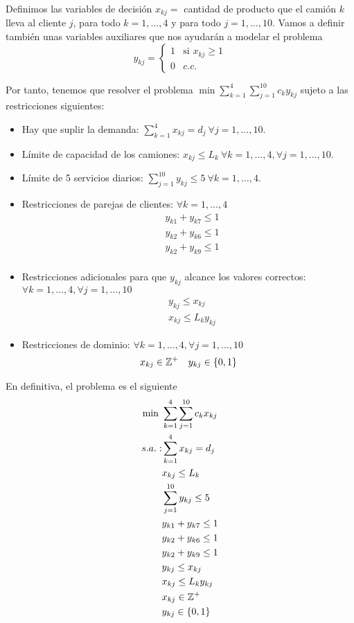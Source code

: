 \documentclass[twoside]{article}
\begin{document}
\begin{solucion}
Definimos las variables de decisión $x_{kj}=$ cantidad de producto que el camión $k$ lleva al cliente $j$, para todo $k=1,\dots, 4$ y para todo $j=1,\dots, 10$. Vamos a definir también unas variables auxiliares que nos ayudarán a modelar el problema
\[
y_{kj}=\begin{cases}
1 & \text{si }x_{kj}\geq 1\\
0 & c.c.
\end{cases}
\]

Por tanto, tenemos que resolver el problema $\min \sum_{k=1}^4\sum_{j=1}^{10}c_ky_{kj}$ sujeto a las restricciones siguientes:
\begin{itemize}
\item Hay que suplir la demanda: $\sum_{k=1}^4 x_{kj}=d_j\ \forall j=1,\dots, 10$.
\item Límite de capacidad de los camiones: $x_{kj}\leq L_k\ \forall k=1,\dots, 4, \forall j=1,\dots, 10$. 
\item Límite de 5 servicios diarios: $\sum_{j=1}^{10} y_{kj}\leq 5\ \forall k=1,\dots, 4$.
\item Restricciones de parejas de clientes: $\forall k=1,\dots, 4$
\begin{align*}
&y_{k1}+y_{k7}\leq 1\\
&y_{k2}+y_{k6}\leq 1\\
&y_{k2}+y_{k9}\leq 1\\
\end{align*}
\item Restricciones adicionales para que $y_{kj}$ alcance los valores correctos: $\forall k=1,\dots, 4, \forall j=1,\dots, 10$
\begin{align*}
&y_{kj}\leq x_{kj}\\
&x_{kj}\leq L_k y_{kj}
\end{align*}
\item Restricciones de dominio: $\forall k=1,\dots, 4, \forall j=1,\dots, 10$
\begin{align*}
&x_{kj}\in\mathbb{Z}^+
&y_{kj}\in\{0,1\}
\end{align*}
\end{itemize}

En definitiva, el problema es el siguiente
\begin{align*}
\min\ & \sum_{k=1}^4\sum_{j=1}^{10}c_kx_{kj}\\
s.a.: & \sum_{k=1}^4 x_{kj}=d_j\\
      & x_{kj}\leq L_k\\
      &\sum_{j=1}^{10} y_{kj}\leq 5\\
      &y_{k1}+y_{k7}\leq 1\\
	  &y_{k2}+y_{k6}\leq 1\\
	  &y_{k2}+y_{k9}\leq 1\\
	  &y_{kj}\leq x_{kj}\\
	  &x_{kj}\leq L_k y_{kj}\\
	  &x_{kj}\in\mathbb{Z}^+\\
      &y_{kj}\in\{0,1\}
\end{align*}

\end{solucion}
\end{document}
